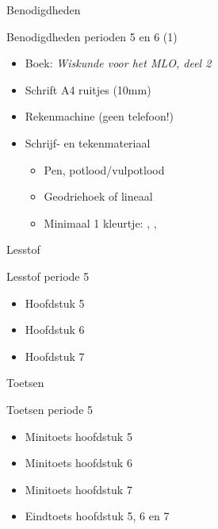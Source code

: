 \begin{frame}{Benodigdheden}

\begin{block}{Benodigdheden perioden 5 en 6 (1)}
\begin{itemize}
    \item Boek: \emph{Wiskunde voor het MLO, deel 2}
    \item Schrift A4 ruitjes (10mm)
    \item Rekenmachine (geen telefoon!)
    \item Schrijf- en tekenmateriaal
    \begin{itemize}
    \item Pen, potlood/vulpotlood
    \item Geodriehoek of lineaal
    \item Minimaal 1 kleurtje: \color{red}{rood}, \color{green}{groen}, \color{blue}{blauw}
    \end{itemize}
\end{itemize}
\end{block}
\end{frame}



\begin{frame}{Lesstof}
\begin{block}{Lesstof periode 5}
\begin{itemize}
 \item Hoofdstuk 5
 \item Hoofdstuk 6
 \item Hoofdstuk 7
\end{itemize}
\end{block}
\end{frame}

\begin{frame}{Toetsen}
\begin{block}{Toetsen periode 5}
\begin{itemize}
 \item Minitoets hoofdstuk 5
 \item Minitoets hoofdstuk 6
 \item Minitoets hoofdstuk 7
 \item Eindtoets hoofdstuk 5, 6 en 7
 \end{itemize}
\end{block}
\end{frame}
